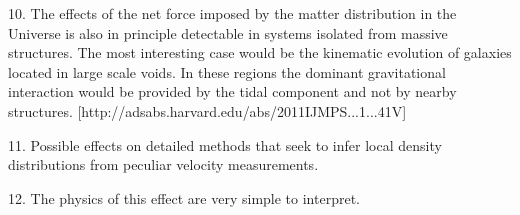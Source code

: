 \documentclass{article}
\begin{document}
10. The effects of the net force imposed by the matter distribution
in the Universe is also in principle detectable in systems isolated 
from massive structures. The most interesting case would be the
kinematic evolution of galaxies located in large scale voids. In these
regions the dominant gravitational interaction would be provided by
the tidal component and not by nearby
structures. [http://adsabs.harvard.edu/abs/2011IJMPS...1...41V] 



11. Possible effects on detailed methods that seek to infer local
density distributions from peculiar velocity measurements. 

12. The physics of this effect are very simple to interpret.





 
\end{document}
